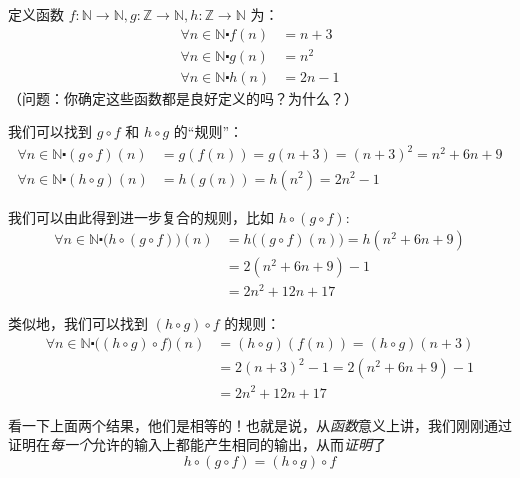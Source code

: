 \begin{example}
    定义函数 $f : \mathbb{N} \to \mathbb{N}, g : \mathbb{Z} \to \mathbb{N}, h : \mathbb{Z} \to \mathbb{N}$ 为：
    \begin{align*}
        \forall n \in \mathbb{N} \centerdot f(n) & = n + 3  \\
        \forall n \in \mathbb{N} \centerdot g(n) & = n^2    \\
        \forall n \in \mathbb{N} \centerdot h(n) & = 2n - 1
    \end{align*}
    （问题：你确定这些函数都是良好定义的吗？为什么？）

    我们可以找到 $g \circ f$ 和 $h \circ g$ 的``规则''：
    \begin{align*}
        \forall n \in \mathbb{N} \centerdot (g \circ f)(n) & = g(f(n)) = g(n + 3) = (n + 3)^2 = n^2 + 6n + 9 \\
        \forall n \in \mathbb{N} \centerdot (h \circ g)(n) & = h(g(n)) = h(n^2) = 2n^2-1
    \end{align*}

    我们可以由此得到进一步复合的规则，比如 $h \circ (g \circ f)$:
    \begin{align*}
        \forall n \in \mathbb{N} \centerdot \big(h \circ (g \circ f)\big)(n) & = h\big((g \circ f)(n)\big) = h(n^2 + 6n + 9) \\
                                                                             & = 2(n^2 + 6n + 9) - 1                         \\
                                                                             & = 2n^2 + 12n + 17
    \end{align*}

    类似地，我们可以找到 $(h \circ g) \circ f$ 的规则：
    \begin{align*}
        \forall n \in \mathbb{N} \centerdot \big((h \circ g) \circ f\big)(n) & = (h \circ g)(f(n)) = (h \circ g)(n + 3) \\
                                                                             & = 2(n + 3)^2 - 1 = 2(n^2 + 6n + 9) - 1   \\
                                                                             & = 2n^2 + 12n + 17
    \end{align*}
\end{example}

看一下上面两个结果，他们是相等的！也就是说，从\emph{函数}意义上讲，我们刚刚通过证明在\emph{每一个}允许的输入上都能产生相同的输出，从而\emph{证明}了
\[h \circ (g \circ f) = (h \circ g) \circ f\]

